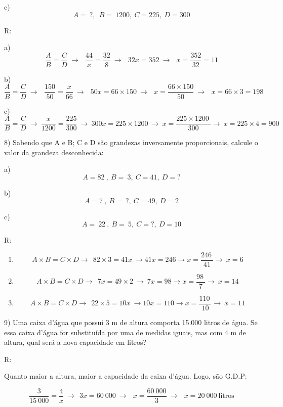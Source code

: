 c) \[A = \ ?,\ \ B = \ 1200,\ C = 225,\ D = 300\]

R:

a)
\[\frac{A}{B} = \frac{C}{D}\  \rightarrow \ \ \ \frac{44}{x} = \frac{32}{8}\  \rightarrow \ \ \ 32x = 352\  \rightarrow \ \ \ x = \frac{352}{32} = 11\]

b)
\[\frac{A}{B} = \frac{C}{D}\  \rightarrow \ \ \ \frac{150}{50} = \frac{x}{66}\  \rightarrow \ \ \ 50x = 66 \times 150\  \rightarrow \ \ \ x = \frac{66 \times 150}{50}\  \rightarrow \ \ \ x = 66 \times 3 = 198\]

c)
\[\frac{A}{B} = \frac{C}{D}\  \rightarrow \ \frac{x}{1200} = \frac{225}{300}\  \rightarrow \ 300x = 225 \times 1200\  \rightarrow \ x = \frac{225 \times 1200\ }{300} \rightarrow \ x = 225 \times 4 = 900\]

8) Sabendo que A e B; C e D são grandezas inversamente proporcionais,
calcule o valor da grandeza desconhecida:

a) \[A = 82\ ,\ B = \ 3,\ C = 41,\ D = ?\]

b) \[A = 7\ ,\ B = \ ?,\ C = 49,\ D = 2\]

c) \[A = \ 22\ ,\ B = \ 5,\ C = ?,\ D = 10\]

R:

\begin{enumerate}
\def\labelenumi{\alph{enumi})}
\item
  \[A \times B = C \times D \rightarrow \ \ 82 \times 3 = 41x\  \rightarrow 41x = 246 \rightarrow x = \frac{246\ }{41} \rightarrow \ x = 6\]
\item
  \[A \times B = C \times D \rightarrow \ \ 7x = 49 \times 2\  \rightarrow \ 7x = 98 \rightarrow x = \frac{98\ }{7} \rightarrow \ x = 14\]
\item
  \[A \times B = C \times D \rightarrow \ \ 22 \times 5 = 10x\  \rightarrow 10x = 110 \rightarrow x = \frac{110\ }{10} \rightarrow \ x = 11\]
\end{enumerate}

9) Uma caixa d'água que possui 3 m de altura comporta 15.000 litros de
água. Se essa caixa d'água for substituída por uma de medidas iguais,
mas com 4 m de altura, qual será a nova capacidade em litros?

R:

Quanto maior a altura, maior a capacidade da caixa d'água. Logo, são
G.D.P:

\[\frac{3}{15\ 000} = \frac{4}{x}\  \rightarrow \ \ 3x = 60\ 000\  \rightarrow \ \ \ x = \frac{60\ 000}{3}\  \rightarrow \ \ \ x = 20\ 000\ \text{litros}\]

